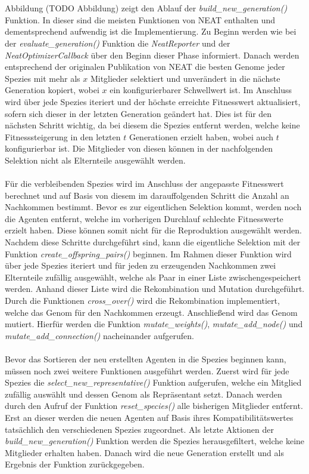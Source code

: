 \\\\
Abbildung (TODO Abbildung) zeigt den Ablauf der \emph{build\_new\_generation()} Funktion. In dieser sind die meisten Funktionen von \ac{NEAT} enthalten und dementsprechend aufwendig ist die Implementierung. Zu Beginn werden wie bei der  \emph{evaluate\_generation()} Funktion die \emph{NeatReporter} und der \emph{NeatOptimizerCallback} über den Beginn dieser Phase informiert. Danach werden entsprechend der originalen Publikation von \ac{NEAT} die besten Genome jeder Spezies mit mehr als $x$ Mitglieder selektiert und unverändert in die nächste Generation kopiert, wobei $x$ ein konfigurierbarer Schwellwert ist. Im Anschluss wird über jede Spezies iteriert und der höchste erreichte Fitnesswert aktualisiert, sofern sich dieser in der letzten Generation geändert hat. Dies ist für den nächsten Schritt wichtig, da bei diesem die Spezies entfernt werden, welche keine Fitnesssteigerung in den letzten $t$ Generationen erzielt haben, wobei auch $t$ konfigurierbar ist. Die Mitglieder von diesen können in der nachfolgenden Selektion nicht als Elternteile ausgewählt werden.
\\\\
Für die verbleibenden Spezies wird im Anschluss der angepasste Fitnesswert berechnet und auf Basis von diesem im darauffolgenden Schritt die Anzahl an Nachkommen bestimmt. Bevor es zur eigentlichen Selektion kommt, werden noch die Agenten entfernt, welche im vorherigen Durchlauf schlechte Fitnesswerte erzielt haben. Diese können somit nicht für die Reproduktion ausgewählt werden. Nachdem diese Schritte durchgeführt sind, kann die eigentliche Selektion mit der Funktion \emph{create\_offspring\_pairs()} beginnen. Im Rahmen dieser Funktion wird über jede Spezies iteriert und für jeden zu erzeugenden Nachkommen zwei Elternteile zufällig ausgewählt, welche als Paar in einer Liste zwischengespeichert werden. Anhand dieser Liste wird die Rekombination und Mutation durchgeführt. Durch die Funktionen \emph{cross\_over()} wird die Rekombination implementiert, welche das Genom für den Nachkommen erzeugt. Anschließend wird das Genom mutiert. Hierfür werden die Funktion \emph{mutate\_weights()}, \emph{mutate\_add\_node()} und \emph{mutate\_add\_connection()} nacheinander aufgerufen.
\\\\
Bevor das Sortieren der neu erstellten Agenten in die Spezies beginnen kann, müssen noch zwei weitere Funktionen ausgeführt werden. Zuerst wird für jede Spezies die \emph{select\_new\_representative()} Funktion aufgerufen, welche ein Mitglied zufällig auswählt und dessen Genom als Repräsentant setzt. Danach werden durch den Aufruf der Funktion \emph{reset\_species()} alle bisherigen Mitglieder entfernt. Erst an dieser werden die neuen Agenten auf Basis ihres Kompatibilitätswertes tatsächlich den verschiedenen Spezies zugeordnet. Als letzte Aktionen der \emph{build\_new\_generation()} Funktion werden die Spezies herausgefiltert, welche keine Mitglieder erhalten haben. Danach wird die neue Generation erstellt und als Ergebnis der Funktion zurückgegeben. 

